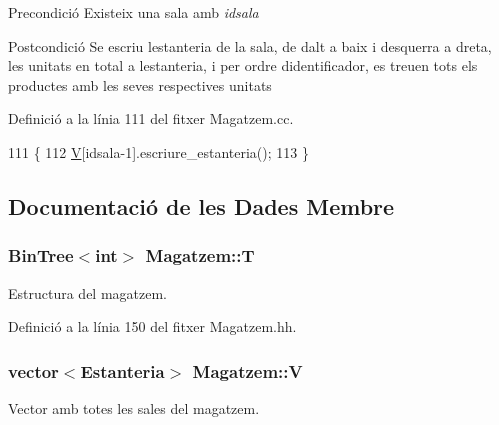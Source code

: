 \begin{DoxyPrecond}{Precondició}
Existeix una sala amb {\itshape idsala} 
\end{DoxyPrecond}
\begin{DoxyPostcond}{Postcondició}
Se escriu l\textquotesingle{}estanteria de la sala, de dalt a baix i d\textquotesingle{}esquerra a dreta, les unitats en total a l\textquotesingle{}estanteria, i per ordre d\textquotesingle{}identificador, es treuen tots els productes amb les seves respectives unitats 
\end{DoxyPostcond}


Definició a la línia 111 del fitxer Magatzem.\+cc.


\begin{DoxyCode}
111                                    \{
112     \hyperlink{class_magatzem_a079afd5b97ad95f76897e54632994cf7}{V}[idsala-1].escriure\_estanteria();
113 \}
\end{DoxyCode}


\subsection{Documentació de les Dades Membre}
\subsubsection[{\texorpdfstring{T}{T}}]{\setlength{\rightskip}{0pt plus 5cm}Bin\+Tree$<$int$>$ Magatzem\+::T\hspace{0.3cm}{\ttfamily [private]}}\hypertarget{class_magatzem_a59167aef8313d2dc57373eb7e442a38c}{}\label{class_magatzem_a59167aef8313d2dc57373eb7e442a38c}


Estructura del magatzem. 



Definició a la línia 150 del fitxer Magatzem.\+hh.

\subsubsection[{\texorpdfstring{V}{V}}]{\setlength{\rightskip}{0pt plus 5cm}vector$<${\bf Estanteria}$>$ Magatzem\+::V\hspace{0.3cm}{\ttfamily [private]}}\hypertarget{class_magatzem_a079afd5b97ad95f76897e54632994cf7}{}\label{class_magatzem_a079afd5b97ad95f76897e54632994cf7}


Vector amb totes les sales del magatzem. 



